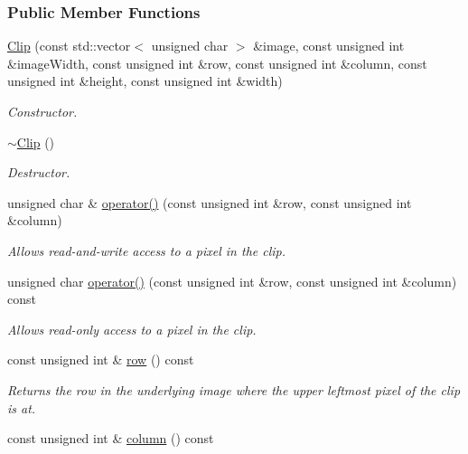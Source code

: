 \subsubsection*{Public Member Functions}
\begin{CompactItemize}
\item 
\hyperlink{class_clip_6264e0334483ad8e0631842a18ac5bc9}{Clip} (const std::vector$<$ unsigned char $>$ \&image, const unsigned int \&imageWidth, const unsigned int \&row, const unsigned int \&column, const unsigned int \&height, const unsigned int \&width)
\begin{CompactList}\small\item\em Constructor. \item\end{CompactList}\item 
\hyperlink{class_clip_88647ed65e3482b5e0533ec98667b0fa}{$\sim$Clip} ()
\begin{CompactList}\small\item\em Destructor. \item\end{CompactList}\item 
unsigned char \& \hyperlink{class_clip_0f80c2b0f0f177fe9c780c93596f77be}{operator()} (const unsigned int \&row, const unsigned int \&column)
\begin{CompactList}\small\item\em Allows read-and-write access to a pixel in the clip. \item\end{CompactList}\item 
unsigned char \hyperlink{class_clip_16b24276181affc5086cb4fe83269fb8}{operator()} (const unsigned int \&row, const unsigned int \&column) const 
\begin{CompactList}\small\item\em Allows read-only access to a pixel in the clip. \item\end{CompactList}\item 
const unsigned int \& \hyperlink{class_clip_1a1d1fd626d1325f0f2b9184de4c89b8}{row} () const 
\begin{CompactList}\small\item\em Returns the row in the underlying image where the upper leftmost pixel of the clip is at. \item\end{CompactList}\item 
const unsigned int \& \hyperlink{class_clip_06a34378fa0f23425d10bb04e9972a26}{column} () const 

\end{CompactItemize}
